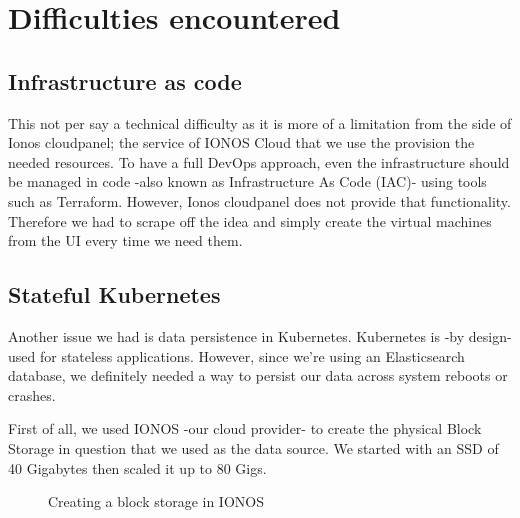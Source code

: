 \section{Difficulties encountered}
\subsection{Infrastructure as code}
This not per say a technical difficulty as it is more of a limitation from the side of Ionos cloudpanel; the service of IONOS Cloud that we use the provision the needed resources.
To have a full DevOps approach, even the infrastructure should be managed in code -also known as Infrastructure As Code (IAC)- using tools such as Terraform.
However, Ionos cloudpanel does not provide that functionality.
Therefore we had to scrape off the idea and simply create the virtual machines from the UI every time we need them.

\subsection{Stateful Kubernetes}
Another issue we had is data persistence in Kubernetes.
Kubernetes is -by design- used for stateless applications.
However, since we're using an Elasticsearch database, we definitely needed a way to persist our data across system reboots or crashes.

First of all, we used IONOS -our cloud provider- to create the physical Block Storage in question that we used as the data source.
We started with an SSD of 40 Gigabytes then scaled it up to 80 Gigs.

\begin{figure}[H]
    \centering
    \caption{Creating a block storage in IONOS}
    \label{fig:ionos-block-storage}
\end{figure}

